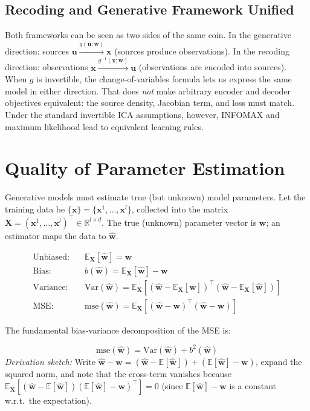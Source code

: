 \documentclass[11pt, oneside]{book}
\newcommand{\R}{\mathbb{R}}
\newcommand{\E}{\mathbb{E}}
\newcommand{\Var}{\mathrm{Var}}
\newcommand{\T}{^{\top}}
\newcommand{\wvec}{\bm{w}}
\newcommand{\what}{\hat{\bm{w}}}
\newcommand{\xvec}{\bm{x}}
\newcommand{\Xmat}{\bm{X}}
\newcommand{\uvec}{\bm{u}}
\newcommand{\mse}{\mathrm{mse}}
\newcommand{\bias}{b}
\begin{document}
\subsection{Recoding and Generative Framework Unified}

Both frameworks can be seen as two sides of the same coin.
In the generative direction: sources $\uvec \xrightarrow{g(\uvec;\wvec)} \xvec$
(sources produce observations).
In the recoding direction: observations $\xvec \xrightarrow{g^{-1}(\xvec;\wvec)} \uvec$
(observations are encoded into sources).
When $g$ is invertible, the change-of-variables formula lets us express the same model
in either direction. That does \emph{not} make arbitrary encoder and decoder objectives
equivalent: the source density, Jacobian term, and loss must match. Under the standard
invertible ICA assumptions, however, INFOMAX and maximum likelihood lead to equivalent
learning rules.


\section{Quality of Parameter Estimation}
\label{sec:quality-estimation}

Generative models must estimate true (but unknown) model parameters.
Let the training data be $\{\xvec\} = \{\xvec^1,\ldots,\xvec^l\}$, collected into the
matrix $\Xmat = (\xvec^1,\ldots,\xvec^l)\T \in \R^{l \times d}$.
The true (unknown) parameter vector is $\wvec$; an estimator maps the data to $\what$.

\begin{defbox}[title={Estimator Quality Measures}]
\begin{align*}
  \text{Unbiased:} \quad & \E_{\Xmat}[\what] = \wvec \\[4pt]
  \text{Bias:} \quad & \bias(\what) = \E_{\Xmat}[\what] - \wvec \\[4pt]
  \text{Variance:} \quad & \Var(\what) = \E_{\Xmat}\!\left[(\what - \E_{\Xmat}[\what])\T(\what - \E_{\Xmat}[\what])\right] \\[4pt]
  \text{MSE:} \quad & \mse(\what) = \E_{\Xmat}\!\left[(\what - \wvec)\T(\what - \wvec)\right]
\end{align*}
\end{defbox}

The fundamental bias-variance decomposition of the MSE is:

\begin{thmbox}[title={Bias-Variance Decomposition}]
\[
  \mse(\what) = \Var(\what) + \bias^2(\what)
\]
\emph{Derivation sketch:} Write $\what - \wvec = (\what - \E[\what]) + (\E[\what] - \wvec)$,
expand the squared norm, and note that the cross-term vanishes because
$\E_{\Xmat}[(\what - \E[\what])(\E[\what] - \wvec)\T] = 0$
(since $\E[\what] - \wvec$ is a constant w.r.t.\ the expectation).
\end{thmbox}
\end{document}
